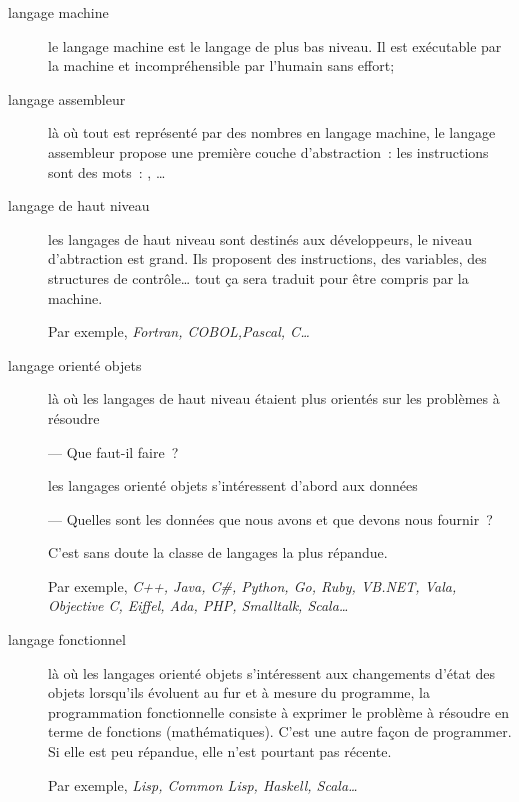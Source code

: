 \begin{description}
	\item[langage machine]
		le langage machine est le langage de plus bas niveau. Il est exécutable 
		par la machine et incompréhensible par l'humain sans effort;
	
	\item[langage assembleur]
		là où tout est représenté par des nombres en langage machine, le langage
		assembleur propose une première couche d'abstraction~: les instructions
		sont des mots~: , … 
	
	\item[langage de haut niveau]
		
		les langages de haut niveau sont destinés aux développeurs, le niveau
		d'abtraction est grand. Ils proposent des instructions, des variables,
		des structures de contrôle… tout ça sera traduit pour être compris par
		la machine. 
		
		Par exemple, \textit{Fortran, COBOL,Pascal, C…}
	
	\item[langage orienté objets]

		là où les langages de haut niveau étaient plus orientés sur les problèmes
		à résoudre 
		
		— Que faut-il faire~? 
		
		les langages orienté objets s'intéressent d'abord aux données 
		
		— Quelles sont les données que nous avons et que devons nous fournir~? 
		
		C'est sans doute la classe de langages la plus répandue. 
		
		Par exemple, {\it C++, Java, C\#, Python, Go, Ruby, VB.NET, Vala,}
		\textit{Objective C, Eiffel, Ada, PHP, Smalltalk, Scala… }

	\item[langage fonctionnel]

		là où les langages orienté objets s'intéressent aux changements d'état 
		des objets lorsqu'ils évoluent au fur et à mesure du programme, la 
		programmation fonctionnelle consiste à exprimer le problème à résoudre en 
		terme de fonctions (mathématiques). C'est une autre façon de programmer. 
		Si elle est peu répandue, elle n'est pourtant pas récente.

		Par exemple, \textit{Lisp, Common Lisp, Haskell, Scala…}

\end{description}

